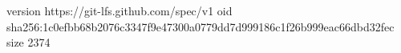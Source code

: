 version https://git-lfs.github.com/spec/v1
oid sha256:1c0efbb68b2076c3347f9e47300a0779dd7d999186c1f26b999eac66dbd32fec
size 2374
